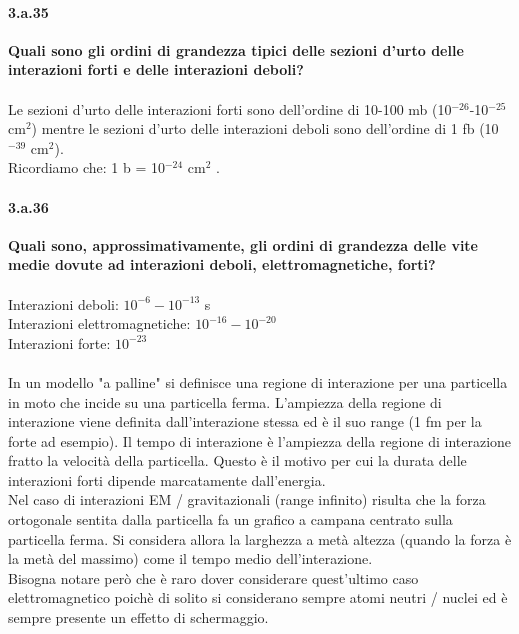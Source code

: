 \documentclass[twoside]{article}
\begin{document}
\paragraph{3.a.35}\textbf{Quali sono gli ordini di grandezza tipici delle sezioni d’urto delle interazioni forti
e delle interazioni deboli?}\\ \\
Le sezioni d’urto delle interazioni forti sono dell’ordine di 10-100
mb (10$^{-26}$-10$^{-25}$ cm$^2$) mentre le sezioni d’urto delle interazioni deboli sono dell'ordine di 1 fb (10$^{-39}$ cm$^2$).\\
Ricordiamo che: 1 b = 10$^{-24}$ cm$^2$
.
\paragraph{3.a.36}\textbf{Quali sono, approssimativamente, gli ordini di grandezza delle vite medie dovute ad interazioni deboli, elettromagnetiche, forti?}\\
\\
Interazioni deboli: $10^{-6}-10^{-13}$
s\\
Interazioni elettromagnetiche: $10^{-16}-10^{-20}$\\
Interazioni forte: $10^{-23}$\\
\\
In un modello "a palline" si definisce una regione di interazione per una particella in moto che incide su una particella ferma.
L'ampiezza della regione di interazione viene definita dall'interazione stessa ed è il suo range (1 fm per la forte ad esempio).
Il tempo di interazione è l'ampiezza della regione di interazione fratto la velocità della particella. Questo è il motivo per cui la durata delle interazioni forti dipende marcatamente dall'energia.
\\
Nel caso di interazioni EM / gravitazionali (range infinito) risulta che la forza ortogonale sentita dalla particella fa un grafico a campana centrato sulla particella ferma. Si considera allora la larghezza a metà altezza (quando la forza è la metà del massimo) come il tempo medio dell'interazione.
\\
Bisogna notare però che è raro dover considerare quest'ultimo caso elettromagnetico poichè di solito si considerano sempre atomi neutri / nuclei ed è sempre presente un effetto di schermaggio.
\end{document}
